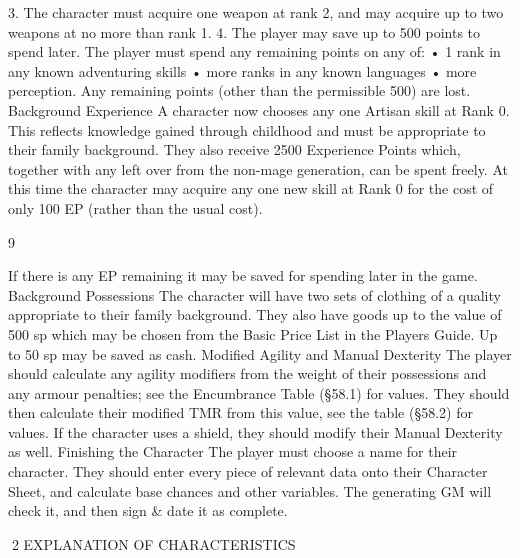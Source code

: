 \documentclass[a4paper]{article}
\begin{document}
\begin{multicols}{3}
3. The character must acquire one weapon at rank
2, and may acquire up to two weapons at no more
than rank 1.
4. The player may save up to 500 points to spend
later. The player must spend any remaining points
on any of:
• 1 rank in any known adventuring skills
• more ranks in any known languages
• more perception.
Any remaining points (other than the permissible
500) are lost.
Background Experience
A character now chooses any one Artisan skill at
Rank 0. This reflects knowledge gained through
childhood and must be appropriate to their family
background.
They also receive 2500 Experience Points which,
together with any left over from the non-mage
generation, can be spent freely.
At this time the character may acquire any one new
skill at Rank 0 for the cost of only 100 EP (rather
than the usual cost).

9

If there is any EP remaining it may be saved for
spending later in the game.
Background Possessions
The character will have two sets of clothing of a
quality appropriate to their family background.
They also have goods up to the value of 500 sp
which may be chosen from the Basic Price List in
the Players Guide. Up to 50 sp may be saved as
cash.
Modified Agility and Manual Dexterity
The player should calculate any agility modifiers
from the weight of their possessions and any armour penalties; see the Encumbrance Table (§58.1)
for values. They should then calculate their modified TMR from this value, see the table (§58.2) for
values. If the character uses a shield, they should
modify their Manual Dexterity as well.
Finishing the Character
The player must choose a name for their character.
They should enter every piece of relevant data onto
their Character Sheet, and calculate base chances
and other variables. The generating GM will check
it, and then sign \& date it as complete.

2 EXPLANATION OF CHARACTERISTICS


\end{multicols}
\end{document}
